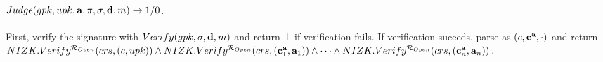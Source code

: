 \paragraph{$Judge(gpk,upk,\mathbf{a},\pi,\sigma,\mathbf{d},m)
  \rightarrow 1/0$.} %
First, verify the signature with $Verify(gpk,\sigma,\mathbf{d},m)$ and
return $\bot$ if verification fails. If verification suceeds, parse
\sig as $(c,\mathbf{c}^{\mathbf{a}},\cdot)$ and return
$NIZK.Verify^{\mathcal{R}_{Open}}(crs,(c,upk)) \land
NIZK.Verify^{\mathcal{R}_{Open}}(crs,(\mathbf{c}_1^{\mathbf{a}},\mathbf{a}_1)) \land
\dots \land
NIZK.Verify^{\mathcal{R}_{Open}}(crs,(\mathbf{c}_n^{\mathbf{a}},\mathbf{a}_n))$.


